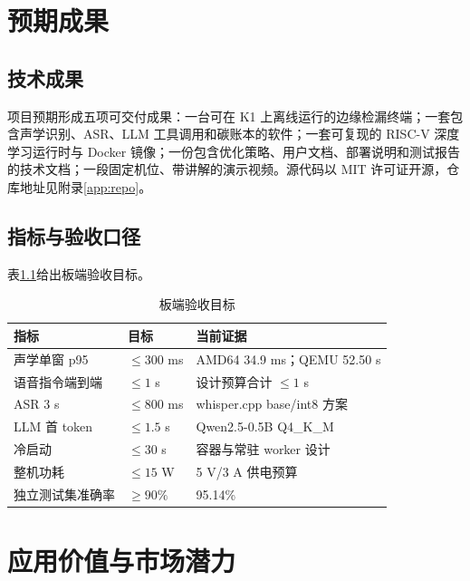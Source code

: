 \documentclass[lang=cn,11pt,scheme=chinese,chinesefont=nofont,color=green]{elegantbook}
\begin{document}
\chapter{预期成果}
\label{ch:outcome}

\section{技术成果}

项目预期形成五项可交付成果：一台可在 K1 上离线运行的边缘检漏终端；一套包含声学识别、ASR、LLM 工具调用和碳账本的软件；一套可复现的 RISC-V 深度学习运行时与 Docker 镜像；一份包含优化策略、用户文档、部署说明和测试报告的技术文档；一段固定机位、带讲解的演示视频。源代码以 MIT 许可证开源，仓库地址见附录\ref{app:repo}。

\section{指标与验收口径}

表\ref{tab:targets}给出板端验收目标。

\begin{table}[htbp]
\centering
\small
\caption{板端验收目标}
\label{tab:targets}
\begin{tabular}{p{3.2cm}p{2.6cm}p{4.6cm}}
\toprule
指标 & 目标 & 当前证据 \\
\midrule
声学单窗 p95 & \(\leq300\) ms & AMD64 34.9 ms；QEMU 52.50 s  \\
语音指令端到端 & \(\leq1\) s & 设计预算合计 \(\leq1\) s  \\
ASR 3 s & \(\leq800\) ms & whisper.cpp base/int8 方案  \\
LLM 首 token & \(\leq1.5\) s & Qwen2.5-0.5B Q4\_K\_M  \\
冷启动 & \(\leq30\) s & 容器与常驻 worker 设计  \\
整机功耗 & \(\leq15\) W & 5 V/3 A 供电预算  \\
独立测试集准确率 & \(\geq90\%\) & 95.14\%  \\
\bottomrule
\end{tabular}
\end{table}

\chapter{应用价值与市场潜力}
\label{ch:value}
\end{document}
